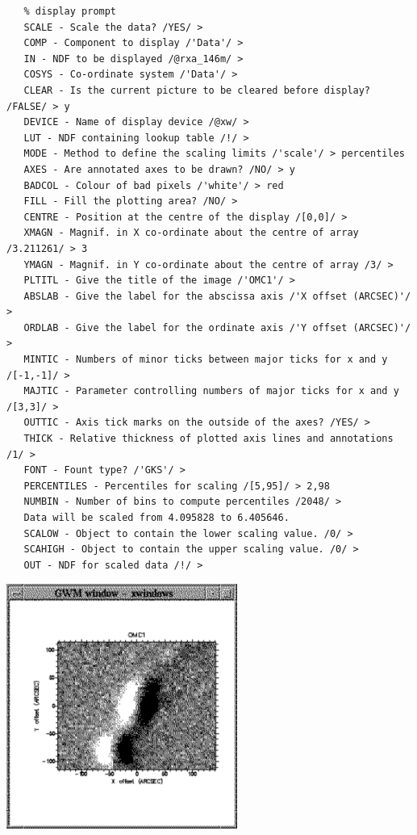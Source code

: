 \documentclass[11pt]{article}
\newcommand{\htmladdimg}[1]{}
\newenvironment{latexonly}{}{}
\begin{document}
\begin{verbatim}
   % display prompt
   SCALE - Scale the data? /YES/ >
   COMP - Component to display /'Data'/ >
   IN - NDF to be displayed /@rxa_146m/ >
   COSYS - Co-ordinate system /'Data'/ >
   CLEAR - Is the current picture to be cleared before display? /FALSE/ > y
   DEVICE - Name of display device /@xw/ >
   LUT - NDF containing lookup table /!/ >
   MODE - Method to define the scaling limits /'scale'/ > percentiles
   AXES - Are annotated axes to be drawn? /NO/ > y
   BADCOL - Colour of bad pixels /'white'/ > red
   FILL - Fill the plotting area? /NO/ >
   CENTRE - Position at the centre of the display /[0,0]/ >
   XMAGN - Magnif. in X co-ordinate about the centre of array /3.211261/ > 3
   YMAGN - Magnif. in Y co-ordinate about the centre of array /3/ >
   PLTITL - Give the title of the image /'OMC1'/ >
   ABSLAB - Give the label for the abscissa axis /'X offset (ARCSEC)'/ >
   ORDLAB - Give the label for the ordinate axis /'Y offset (ARCSEC)'/ >
   MINTIC - Numbers of minor ticks between major ticks for x and y /[-1,-1]/ >
   MAJTIC - Parameter controlling numbers of major ticks for x and y /[3,3]/ >
   OUTTIC - Axis tick marks on the outside of the axes? /YES/ >
   THICK - Relative thickness of plotted axis lines and annotations /1/ >
   FONT - Fount type? /'GKS'/ >
   PERCENTILES - Percentiles for scaling /[5,95]/ > 2,98
   NUMBIN - Number of bins to compute percentiles /2048/ >
   Data will be scaled from 4.095828 to 6.405646.
   SCALOW - Object to contain the lower scaling value. /0/ >
   SCAHIGH - Object to contain the upper scaling value. /0/ >
   OUT - NDF for scaled data /!/ >
\end{verbatim}

\begin{latexonly}
\begin{center}
\leavevmode\includegraphics[height=80mm]{sc1_display2}
\end{center}
\end{latexonly}
\htmladdimg{addon/display2.gif}
\end{document}
